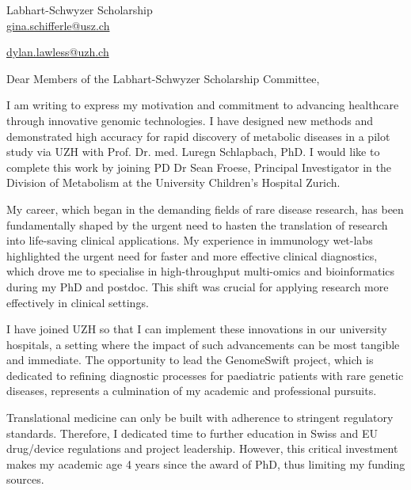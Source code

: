 \documentclass[11pt, a4paper]{letter}
\begin{document}
 
\begin{letter}{} 

\begin{minipage}[t]{0.48\textwidth}
\raggedright
Labhart-Schwyzer Scholarship\\
\href{mailto:gina.schifferle@usz.ch}{gina.schifferle@usz.ch}
\end{minipage}
\hfill
\begin{minipage}[t]{0.48\textwidth}
\raggedleft
\href{mailto:dylan.lawless@uzh.ch}{dylan.lawless@uzh.ch} \\
\end{minipage}

\opening{Dear Members of the Labhart-Schwyzer Scholarship Committee,}

I am writing to express my motivation and commitment  to advancing healthcare through innovative genomic technologies. 
I have designed new methods and demonstrated high accuracy for rapid discovery of metabolic diseases in a pilot study via UZH with Prof. Dr. med. Luregn Schlapbach, PhD. I would like to complete this work by joining PD Dr Sean Froese, Principal Investigator in the Division of Metabolism at the University Children's Hospital Zurich.

My career, which began in the demanding fields of rare disease research, has been fundamentally shaped by the urgent need to hasten the translation of research into life-saving clinical applications. My experience in immunology wet-labs highlighted the urgent need for faster and more effective clinical diagnostics, which drove me to specialise in high-throughput multi-omics and bioinformatics during my PhD and postdoc. This shift was crucial for applying research more effectively in clinical settings.

I have joined UZH so that I can implement these innovations in our university hospitals, a setting where the impact of such advancements can be most tangible and immediate. The opportunity to lead the GenomeSwift project, which is dedicated to refining diagnostic processes for paediatric patients with rare genetic diseases, represents a culmination of my academic and professional pursuits.

Translational medicine can only be built with adherence to stringent regulatory standards. Therefore, I dedicated time to further education in Swiss and EU drug/device regulations and project leadership. However, this critical investment makes my academic age 4 years since the award of PhD, thus limiting my funding sources. 


\end{letter}
\end{document}
